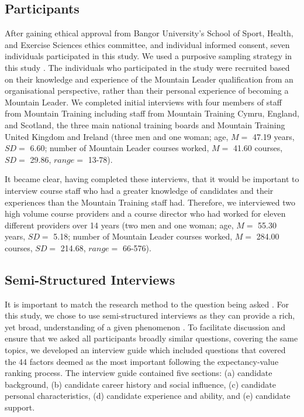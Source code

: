 \documentclass[
  12pt,
  a4paper,
]{book}
\begin{document}
\hypertarget{participants}{%
\subsection{Participants}\label{participants}}

After gaining ethical approval from Bangor University's School of Sport, Health, and Exercise Sciences ethics committee, and individual informed consent, seven individuals participated in this study. We used a purposive sampling strategy in this study \citep{Patton2002, Sparkes2014}. The individuals who participated in the study were recruited based on their knowledge and experience of the Mountain Leader qualification from an organisational perspective, rather than their personal experience of becoming a Mountain Leader. We completed initial interviews with four members of staff from Mountain Training including staff from Mountain Training Cymru, England, and Scotland, the three main national training boards and Mountain Training United Kingdom and Ireland (three men and one woman; age, \(M =\) 47.19 years, \(SD =\) 6.60; number of Mountain Leader courses worked, \(M =\) 41.60 courses, \(SD =\) 29.86, \(range =\) 13-78).

It became clear, having completed these interviews, that it would be important to interview course staff who had a greater knowledge of candidates and their experiences than the Mountain Training staff had. Therefore, we interviewed two high volume course providers and a course director who had worked for eleven different providers over 14 years (two men and one woman; age, \(M =\) 55.30 years, \(SD =\) 5.18; number of Mountain Leader courses worked, \(M =\) 284.00 courses, \(SD =\) 214.68, \(range =\) 66-576).

\hypertarget{semi-structured-interviews}{%
\subsection{Semi-Structured Interviews}\label{semi-structured-interviews}}

It is important to match the research method to the question being asked \citep{Smith2016}. For this study, we chose to use semi-structured interviews as they can provide a rich, yet broad, understanding of a given phenomenon \citep{Lincoln1985}. To facilitate discussion and ensure that we asked all participants broadly similar questions, covering the same topics, we developed an interview guide which included questions that covered the 44 factors deemed as the most important following the expectancy-value ranking process. The interview guide contained five sections: (a) candidate background, (b) candidate career history and social influence, (c) candidate personal characteristics, (d) candidate experience and ability, and (e) candidate support.
\end{document}
